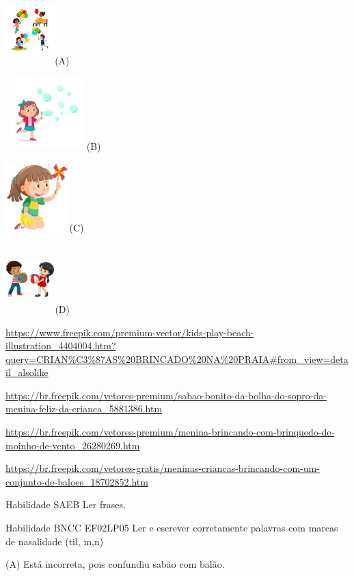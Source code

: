 \includegraphics[width=0.75159in,height=1.04531in]{media/image78.jpeg}(A)

\includegraphics[width=1.23681in,height=1.10139in]{media/image79.jpeg}(B)

\includegraphics[width=0.97361in,height=1.05069in]{media/image80.jpeg}(C)

\includegraphics[width=0.75437in,height=1.04404in]{media/image81.jpeg}(D)

\url{https://www.freepik.com/premium-vector/kids-play-beach-illustration_4404004.htm?query=CRIAN\%C3\%87AS\%20BRINCADO\%20NA\%20PRAIA\#from_view=detail_alsolike}

\url{https://br.freepik.com/vetores-premium/sabao-bonito-da-bolha-do-sopro-da-menina-feliz-da-crianca_5881386.htm}

\url{https://br.freepik.com/vetores-premium/menina-brincando-com-brinquedo-de-moinho-de-vento_26280269.htm}

\url{https://br.freepik.com/vetores-gratis/meninas-criancas-brincando-com-um-conjunto-de-baloes_18702852.htm}

Habilidade SAEB Ler frases.

Habilidade BNCC EF02LP05 Ler e escrever corretamente palavras com marcas
de nasalidade (til, m,n)

(A) Está incorreta, pois confundiu sabão com balão.

